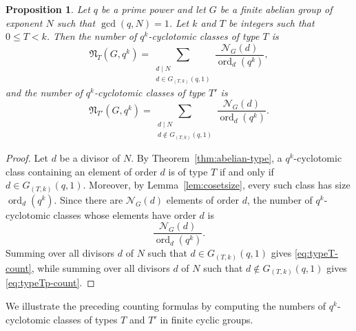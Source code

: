 \documentclass[pdflatex,sn-mathphys-num]{sn-jnl}%
\theoremstyle{thmstyleone}%
\newtheorem{proposition}[theorem]{Proposition}%
\theoremstyle{thmstyletwo}%
\theoremstyle{thmstylethree}%
\newcommand{\ord}{\operatorname{ord}}
\begin{document}
\begin{proposition}\label{prop:type-count}
Let $q$ be a prime power and let $G$ be a finite abelian group of exponent $N$ such that $\gcd(q,N)=1$.  Let $k$ and $T$ be integers such that $0\le T<k$. Then the number of $q^k$-cyclotomic classes of type $T$ is
\begin{equation}\label{eq:typeT-count}
\mathfrak{N}_T(G,q^k)
=
\sum_{\substack{d\mid N\\ d\in G_{(T,k)}(q,1)}}
\frac{\mathcal{N}_G(d)}{\ord_d(q^k)},
\end{equation}
and the number of $q^k$-cyclotomic classes of type $T'$ is
\begin{equation}\label{eq:typeTp-count}
\mathfrak{N}_{T'}(G,q^k)
=
\sum_{\substack{d\mid N\\ d\notin G_{(T,k)}(q,1)}}
\frac{\mathcal{N}_G(d)}{\ord_d(q^k)}.
\end{equation}
\end{proposition}

\begin{proof}
Let $d$ be a divisor of $N$. By Theorem~\ref{thm:abelian-type}, a $q^k$-cyclotomic class containing an element of order $d$ is of type $T$ if and only if
$
d\in G_{(T,k)}(q,1).
$
Moreover, by Lemma~\ref{lem:cosetsize}, every such class has size $\ord_d(q^k)$. Since there are $\mathcal{N}_G(d)$ elements of order $d$, the number of $q^k$-cyclotomic classes whose elements have order $d$ is
\[
\frac{\mathcal{N}_G(d)}{\ord_d(q^k)}.
\]
Summing over all divisors $d$ of $N$ such that $d\in G_{(T,k)}(q,1)$ gives \eqref{eq:typeT-count}, while summing over all divisors $d$ of $N$ such that $d\notin G_{(T,k)}(q,1)$ gives \eqref{eq:typeTp-count}.
\end{proof}

We illustrate the preceding counting formulas by computing the numbers of $q^k$-cyclotomic classes of types $T$ and $T'$   in finite cyclic groups.
\end{document}
